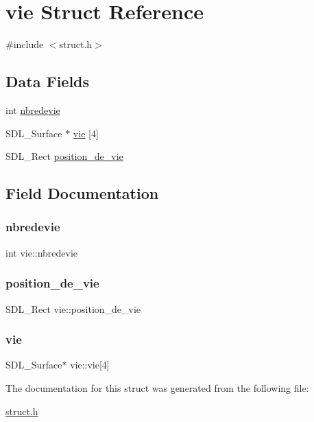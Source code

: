 \hypertarget{structvie}{}\section{vie Struct Reference}
\label{structvie}


{\ttfamily \#include $<$struct.\+h$>$}

\subsection*{Data Fields}
\begin{DoxyCompactItemize}
\item 
int \hyperlink{structvie_ace0f84a19ce4f5854ec56c137b33b947}{nbredevie}
\item 
S\+D\+L\+\_\+\+Surface $\ast$ \hyperlink{structvie_a2c29f60898de16e1306bd1043fa38dc9}{vie} \mbox{[}4\mbox{]}
\item 
S\+D\+L\+\_\+\+Rect \hyperlink{structvie_aaa37f269f7261984f2e540534210af5a}{position\+\_\+de\+\_\+vie}
\end{DoxyCompactItemize}


\subsection{Field Documentation}
\mbox{\label{structvie_ace0f84a19ce4f5854ec56c137b33b947}} 
\subsubsection{\texorpdfstring{nbredevie}{nbredevie}}
{\footnotesize\ttfamily int vie\+::nbredevie}

\mbox{\label{structvie_aaa37f269f7261984f2e540534210af5a}} 
\subsubsection{\texorpdfstring{position\+\_\+de\+\_\+vie}{position\_de\_vie}}
{\footnotesize\ttfamily S\+D\+L\+\_\+\+Rect vie\+::position\+\_\+de\+\_\+vie}

\mbox{\label{structvie_a2c29f60898de16e1306bd1043fa38dc9}} 
\subsubsection{\texorpdfstring{vie}{vie}}
{\footnotesize\ttfamily S\+D\+L\+\_\+\+Surface$\ast$ vie\+::vie\mbox{[}4\mbox{]}}



The documentation for this struct was generated from the following file\+:\begin{DoxyCompactItemize}
\item 
\hyperlink{struct_8h}{struct.\+h}\end{DoxyCompactItemize}

